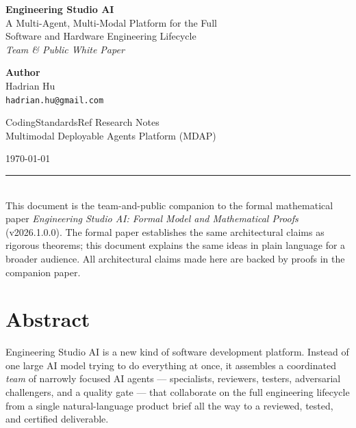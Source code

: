 \documentclass[12pt]{article}
\begin{document}
\begin{titlepage}
    \centering
    \vspace*{1cm}
    {\LARGE \textbf{Engineering Studio AI}}\\[0.3cm]
    {\large A Multi-Agent, Multi-Modal Platform for the Full}\\
    {\large Software and Hardware Engineering Lifecycle}\\[0.2cm]
    {\large \textit{Team \& Public White Paper}}

    \vspace{2cm}

    {\large \textbf{Author}}\\
    Hadrian Hu\\
    \texttt{hadrian.hu@gmail.com}

    \vspace{1cm}

    {\large CodingStandardsRef Research Notes}\\
    Multimodal Deployable Agents Platform (MDAP)

    \vspace{2cm}

    {\large \today}

    \vfill
    \noindent\rule{\textwidth}{0.4pt}\\[0.2cm]
    {\small
    This document is the team-and-public companion to the formal
    mathematical paper
    \textit{Engineering Studio AI: Formal Model and Mathematical Proofs}
    (v2026.1.0.0).
    The formal paper establishes the same architectural claims as
    rigorous theorems; this document explains the same ideas
    in plain language for a broader audience.
    All architectural claims made here are backed by proofs in the
    companion paper.
    }
\end{titlepage}

\newpage
\section*{Abstract}

\noindent
Engineering Studio AI is a new kind of software development platform.
Instead of one large AI model trying to do everything at once, it
assembles a coordinated \emph{team} of narrowly focused AI agents ---
specialists, reviewers, testers, adversarial challengers, and a quality
gate --- that collaborate on the full engineering lifecycle from a
single natural-language product brief all the way to a reviewed,
tested, and certified deliverable.
\end{document}
